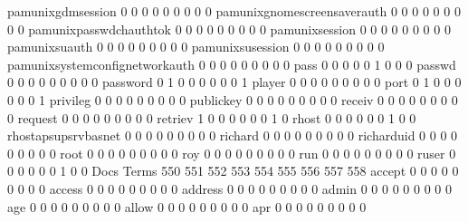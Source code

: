 \documentclass[compress,8pt]{beamer}
\begin{document}
\begin{frame}
\begin{Schunk}
  pamunixgdmsession                          0   0   0   0   0   0   0   0   0
  pamunixgnomescreensaverauth                0   0   0   0   0   0   0   0   0
  pamunixpasswdchauthtok                     0   0   0   0   0   0   0   0   0
  pamunixsession                             0   0   0   0   0   0   0   0   0
  pamunixsuauth                              0   0   0   0   0   0   0   0   0
  pamunixsusession                           0   0   0   0   0   0   0   0   0
  pamunixsystemconfignetworkauth             0   0   0   0   0   0   0   0   0
  pass                                       0   0   0   0   0   1   0   0   0
  passwd                                     0   0   0   0   0   0   0   0   0
  password                                   0   1   0   0   0   0   0   0   1
  player                                     0   0   0   0   0   0   0   0   0
  port                                       0   1   0   0   0   0   0   0   1
  privileg                                   0   0   0   0   0   0   0   0   0
  publickey                                  0   0   0   0   0   0   0   0   0
  receiv                                     0   0   0   0   0   0   0   0   0
  request                                    0   0   0   0   0   0   0   0   0
  retriev                                    1   0   0   0   0   0   0   1   0
  rhost                                      0   0   0   0   0   0   1   0   0
  rhostapsupsrvbasnet                        0   0   0   0   0   0   0   0   0
  richard                                    0   0   0   0   0   0   0   0   0
  richarduid                                 0   0   0   0   0   0   0   0   0
  root                                       0   0   0   0   0   0   0   0   0
  roy                                        0   0   0   0   0   0   0   0   0
  run                                        0   0   0   0   0   0   0   0   0
  ruser                                      0   0   0   0   0   0   1   0   0
                                          Docs
Terms                                      550 551 552 553 554 555 556 557 558
  accept                                     0   0   0   0   0   0   0   0   0
  access                                     0   0   0   0   0   0   0   0   0
  address                                    0   0   0   0   0   0   0   0   0
  admin                                      0   0   0   0   0   0   0   0   0
  age                                        0   0   0   0   0   0   0   0   0
  allow                                      0   0   0   0   0   0   0   0   0
  apr                                        0   0   0   0   0   0   0   0   0

\end{Schunk}
\end{frame}
\end{document}
